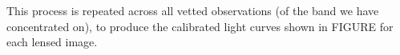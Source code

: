 \documentclass[iop]{emulateapj}
\makeatletter
\newenvironment{inlinefigure}{
\def\@captype{figure}
\noindent\begin{minipage}{0.999\linewidth}\begin{center}}
{\end{center}\end{minipage}\smallskip}
\makeatother
\begin{document}
This process is repeated across all vetted observations (of the band
we have concentrated on), to produce the calibrated light curves shown
in FIGURE for each lensed image.  
\begin{inlinefigure}
\begin{center}
\end{center}
\end{inlinefigure}
\end{document}

